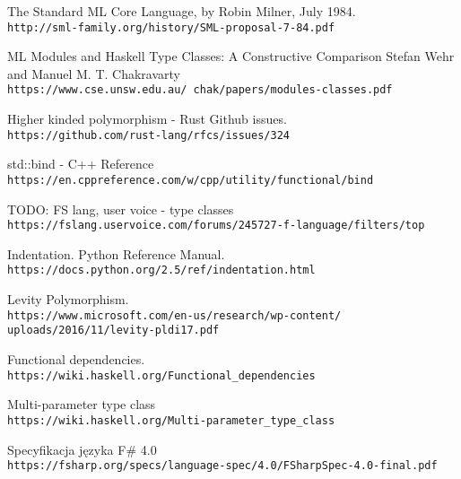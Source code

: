 \documentclass[declaration,shortabstract]{iithesis}
\begin{document}
\begin{thebibliography}{1}

The Standard ML Core Language, by Robin Milner, July 1984.
\\\texttt{http://sml-family.org/history/SML-proposal-7-84.pdf}

ML Modules and Haskell Type Classes:
A Constructive Comparison
Stefan Wehr and Manuel M. T. Chakravarty
\\\texttt{https://www.cse.unsw.edu.au/~chak/papers/modules-classes.pdf}

Higher kinded polymorphism - Rust Github issues.
\\\texttt{https://github.com/rust-lang/rfcs/issues/324}

std::bind - C++ Reference
\\\texttt{https://en.cppreference.com/w/cpp/utility/functional/bind}

TODO: FS lang, user voice - type classes
\\\texttt{https://fslang.uservoice.com/forums/245727-f-language/filters/top}

Indentation. Python Reference Manual.
\\\texttt{https://docs.python.org/2.5/ref/indentation.html}

Levity Polymorphism.
\\\texttt{https://www.microsoft.com/en-us/research/wp-content/\newline
uploads/2016/11/levity-pldi17.pdf}

Functional dependencies.
\\\texttt{https://wiki.haskell.org/Functional\_dependencies}

Multi-parameter type class
\\\texttt{https://wiki.haskell.org/Multi-parameter\_type\_class}

Specyfikacja języka F\# 4.0
\\\texttt{https://fsharp.org/specs/language-spec/4.0/FSharpSpec-4.0-final.pdf}

\end{thebibliography}
\end{document}
